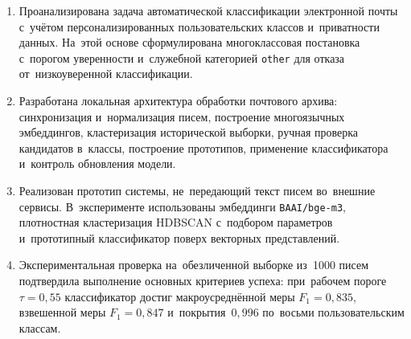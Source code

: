\begin{enumerate}
  \item Проанализирована задача автоматической классификации электронной почты
        с~учётом персонализированных пользовательских классов и~приватности
        данных. На~этой основе сформулирована многоклассовая
        постановка с~порогом уверенности и~служебной категорией
        \texttt{other} для отказа от~низкоуверенной классификации.
  \item Разработана локальная архитектура обработки почтового архива:
        синхронизация и~нормализация писем, построение многоязычных
        эмбеддингов, кластеризация исторической выборки, ручная проверка
        кандидатов в~классы, построение прототипов, применение классификатора
        и~контроль обновления модели.
  \item Реализован прототип системы, не~передающий текст писем во~внешние
        сервисы. В~эксперименте использованы эмбеддинги \texttt{BAAI/bge-m3},
        плотностная кластеризация HDBSCAN с~подбором параметров и~прототипный
        классификатор поверх векторных представлений.
  \item Экспериментальная проверка на~обезличенной выборке из~1000 писем
        подтвердила выполнение основных критериев успеха: при~рабочем пороге
        \(\tau=0{,}55\) классификатор достиг макроусреднённой меры
        \(F_1=0{,}835\), взвешенной меры \(F_1=0{,}847\)
        и~покрытия~\(0{,}996\) по~восьми пользовательским классам.
\end{enumerate}
